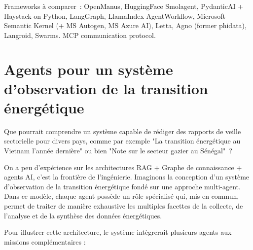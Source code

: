 \documentclass[a4paper,11pt]{report}
\begin{document}
Frameworks à comparer~: OpenManus, HuggingFace Smolagent, PydanticAI + Haystack on Python, LangGraph, LlamaIndex AgentWorkflow, Microsoft Semantic Kernel (+ MS Autogen, MS Azure AI), Letta, Agno (former phidata), Langroid, Swarms. MCP communication protocol.

\section{Agents pour un système d'observation de la transition énergétique}\label{agents-pour-un-systuxe8me-dobservation-de-la-transition-uxe9nerguxe9tique}

Que pourrait comprendre un système capable de rédiger des rapports de veille sectorielle pour divers pays, comme par exemple "La transition énergétique au Vietnam l'année dernière" ou bien "Note sur le secteur gazier au Sénégal"~?

On a peu d'expérience sur les architectures RAG + Graphe de connaissance + agents AI, c'est la frontière de l'ingénierie. Imaginons la conception d'un système d'observation de la transition énergétique fondé sur une approche multi-agent. Dans ce modèle, chaque agent possède un rôle spécialisé qui, mis en commun, permet de traiter de manière exhaustive les multiples facettes de la collecte, de l'analyse et de la synthèse des données énergétiques.

Pour illustrer cette architecture, le système intègrerait plusieurs agents aux missions complémentaires :
\end{document}

